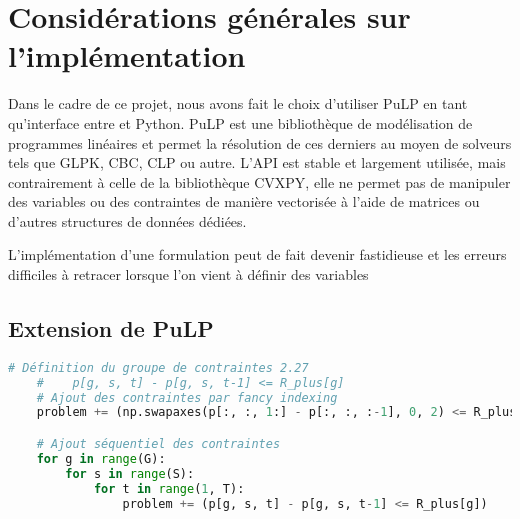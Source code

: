 \chapter{Considérations générales sur l'implémentation}
\vspace*{1.2cm}

Dans le cadre de ce projet, nous avons fait le choix d'utiliser PuLP en tant qu'interface entre
\solver et Python. PuLP est une bibliothèque de modélisation de programmes linéaires et permet
la résolution de ces derniers au moyen de solveurs tels que GLPK, CBC, CLP ou autre.
L'API est stable et largement utilisée, mais contrairement à celle de la bibliothèque CVXPY,
elle ne permet pas de manipuler des variables ou des contraintes de manière vectorisée à l'aide
de matrices ou d'autres structures de données dédiées.

L'implémentation d'une formulation peut de fait devenir fastidieuse et les erreurs difficiles à
retracer lorsque l'on vient à définir des variables 



\section{Extension de PuLP}

\begin{lstlisting}[language=Python]
    # Définition du groupe de contraintes 2.27
    #    p[g, s, t] - p[g, s, t-1] <= R_plus[g]
    # Ajout des contraintes par fancy indexing
    problem += (np.swapaxes(p[:, :, 1:] - p[:, :, :-1], 0, 2) <= R_plus)

    # Ajout séquentiel des contraintes
    for g in range(G):
        for s in range(S):
            for t in range(1, T):
                problem += (p[g, s, t] - p[g, s, t-1] <= R_plus[g])
\end{lstlisting}